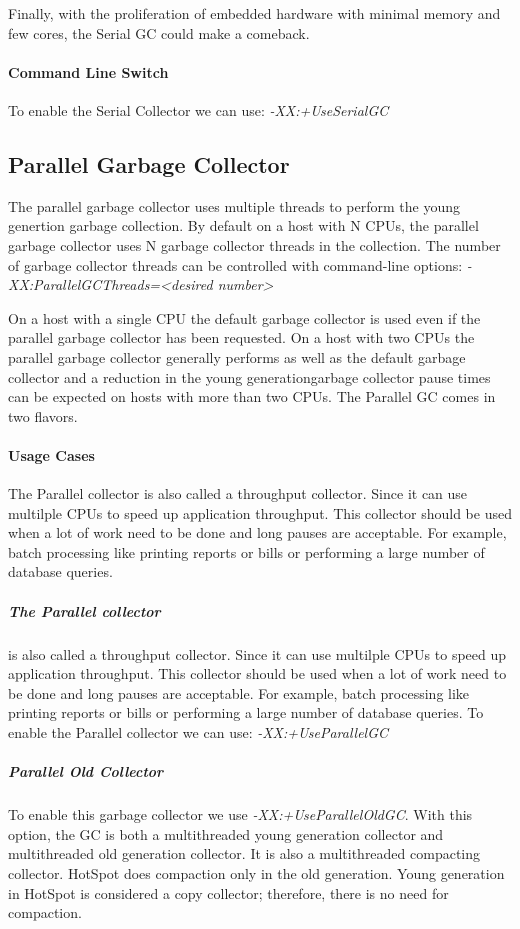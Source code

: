 Finally, with the proliferation of embedded hardware with minimal memory and few cores, the Serial GC could make a comeback.\cite{oracleGC}
\paragraph{Command Line Switch}
To enable the Serial Collector we can use:
\textit{-XX:+UseSerialGC}
\subsection{Parallel Garbage Collector}

The parallel garbage collector uses multiple threads to perform the young genertion garbage collection. By default on a host with N CPUs, the parallel garbage collector uses N garbage collector threads in the collection. The number of garbage collector threads can be controlled with command-line options:
\textit{-XX:ParallelGCThreads=<desired number>}

On a host with a single CPU the default garbage collector is used even if the parallel garbage collector has been requested. On a host with two CPUs the parallel garbage collector generally performs as well as the default garbage collector and a reduction in the young generationgarbage collector pause times can be expected on hosts with more than two CPUs. The Parallel GC comes in two flavors.\cite{oracleGC}
\paragraph{Usage Cases}
The Parallel collector is also called a throughput collector. Since it can use multilple CPUs to speed up application throughput. This collector should be used when a lot of work need to be done and long pauses are acceptable. For example, batch processing like printing reports or bills or performing a large number of database queries.\cite{oracleGC}
\subparagraph{The Parallel collector}
is also called a throughput collector. Since it can use multilple CPUs to speed up application throughput. This collector should be used when a lot of work need to be done and long pauses are acceptable. For example, batch processing like printing reports or bills or performing a large number of database queries.\cite{oracleGC}
To enable the Parallel collector we can use:
\textit{-XX:+UseParallelGC}
\subparagraph{Parallel Old Collector}
To enable this garbage collector we use \textit{-XX:+UseParallelOldGC}. With this option, the GC is both a multithreaded young generation collector and multithreaded old generation collector. It is also a multithreaded compacting collector. HotSpot does compaction only in the old generation. Young generation in HotSpot is considered a copy collector; therefore, there is no need for compaction.


